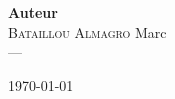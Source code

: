 \begin{titlepage}
\begin{center}
\vfill
{\large
\begin{center}
  {\Large  \hspace{0.5cm} \textbf{Auteur} \hspace{0.5cm}   } \\[0.3cm]
	\textsc{Bataillou Almagro} Marc \\
	  ---
\end{center}
}
\vfill

{\large \today}

\end{center}
\end{titlepage}